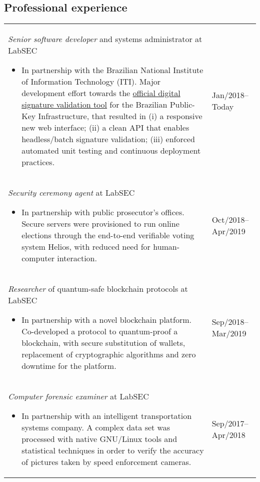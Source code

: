 \documentclass[12pt]{article}
\makeatletter
\newenvironment{datetable}
  {\newcolumntype{R}{>{\raggedleft\arraybackslash}p{0.14\textwidth}}
   \newcolumntype{L}{p{0.84\textwidth}}
   \begin{tabular}{@{\hspace{0mm}}LR}}
  {\end{tabular}}
\newenvironment{contenttable}[1]
  {\subsection*{#1}
   \begin{datetable}}
  {\end{datetable}}
\makeatother
\begin{document}
\begin{contenttable}{Professional experience}
  \textit{Senior software developer} and systems administrator at LabSEC
  \begin{itemize}
    \item In partnership with the Brazilian National Institute of Information
        Technology (ITI). Major development effort towards the
          \href{https://verificador.iti.gov.br}{official digital signature
          validation tool} for the Brazilian Public-Key Infrastructure, that
          resulted in (i) a responsive new web interface; (ii) a clean API that
          enables headless/batch signature validation; (iii) enforced automated
          unit testing and continuous deployment practices.
  \end{itemize} & Jan/2018--Today \\

  \textit{Security ceremony agent} at LabSEC
  \begin{itemize}
    \item In partnership with public prosecutor's offices. Secure servers were
        provisioned to run online elections through the end-to-end verifiable
          voting system Helios, with reduced need for human-computer
          interaction.
  \end{itemize} & Oct/2018--Apr/2019 \\

  \textit{Researcher} of quantum-safe blockchain protocols at LabSEC
  \begin{itemize}
    \item In partnership with a novel blockchain platform. Co-developed a
        protocol to quantum-proof a blockchain, with secure substitution of
          wallets, replacement of cryptographic algorithms and zero downtime
          for the platform.
  \end{itemize} & Sep/2018--Mar/2019 \\

  \textit{Computer forensic examiner} at LabSEC
  \begin{itemize}
    \item In partnership with an intelligent transportation systems company. A
        complex data set was processed with native GNU/Linux tools and
          statistical techniques in order to verify the accuracy of pictures
          taken by speed enforcement cameras.
  \end{itemize} & Sep/2017--Apr/2018 \\


\end{contenttable}
\end{document}
